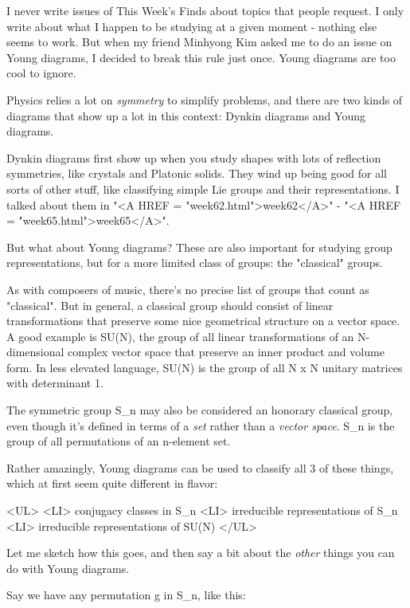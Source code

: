 


I never write issues of This Week's Finds about topics that people
request.  I only write about what I happen to be studying at a given
moment - nothing else seems to work.  But when my friend Minhyong Kim
asked me to do an issue on Young diagrams, I decided to break this 
rule just once.  Young diagrams are too cool to ignore.

Physics relies a lot on \emph{symmetry} to simplify problems, and there are 
two kinds of diagrams that show up a lot in this context: Dynkin diagrams 
and Young diagrams.  

Dynkin diagrams first show up when you study shapes with lots of
reflection symmetries, like crystals and Platonic solids.  They wind up
being good for all sorts of other stuff, like classifying simple Lie
groups and their representations.  I talked about them in "<A HREF
= "week62.html">week62</A>" - "<A HREF =
"week65.html">week65</A>".

But what about Young diagrams?  These are also important for studying
group representations, but for a more limited class of groups: the
"classical" groups.

As with composers of music, there's no precise list of groups that count
as "classical".  But in general, a classical group should consist of
linear transformations that preserve some nice geometrical structure on
a vector space.  A good example is SU(N), the group of all linear
transformations of an N-dimensional complex vector space that preserve
an inner product and volume form.  In less elevated language, SU(N) is
the group of all N x N unitary matrices with determinant 1.

The symmetric group S_{n} may also be considered an honorary classical
group, even though it's defined in terms of a \emph{set} rather than a
\emph{vector space}.  
S_{n} is the group of all permutations of an n-element
set.  

Rather amazingly, Young diagrams can be used to classify all 3 of
these things, which at first seem quite different in flavor:

<UL>
<LI> conjugacy classes in S_{n}
<LI> irreducible representations of S_{n}
<LI> irreducible representations of SU(N)
</UL>

Let me sketch how this goes, and then say a bit about the \emph{other}
things you can do with Young diagrams.

Say we have any permutation g in S_{n}, like this:

